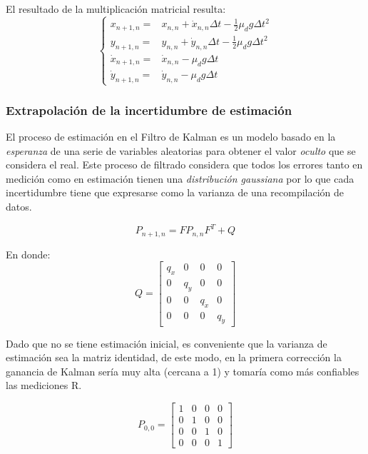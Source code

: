 El resultado de la multiplicación matricial resulta:
\begin{equation}
\left\{\begin{matrix}
x_{n+1, n} = & x_{n,n} + \dot{x}_{n,n} \Delta t - \frac{1}{2} \mu_d g \Delta t^2\\ 
y_{n+1, n} = & y_{n,n} + \dot{y}_{n,n} \Delta t - \frac{1}{2} \mu_d g \Delta t^2\\ 
\dot{x}_{n+1, n} = & \dot{x}_{n,n} - \mu_d g \Delta t\\ 
\dot{y}_{n+1, n} = &\dot{y}_{n,n} - \mu_d g \Delta t 
\end{matrix}\right.
\end{equation}

		\subsubsection*{Extrapolación de la incertidumbre de estimación}
	El proceso de estimación en el Filtro de Kalman es un modelo basado en la \textit{esperanza} de una serie de variables aleatorias para obtener el valor \textit{oculto} que se considera el real. Este proceso de filtrado considera que todos los errores tanto en medición como en estimación tienen una \textit{distribución gaussiana} por lo que cada incertidumbre tiene que expresarse como la varianza de una recompilación de datos.
	
\begin{equation}
P_{n+1,n} = F P_{n,n} F^{T} + Q
\label{eq:extrapolation_covariance}
\end{equation}

En donde:
\begin{equation}
Q =
\begin{bmatrix}
q_x & 0 & 0 & 0\\ 
0 & q_y & 0 & 0\\ 
0 & 0 & q_{\dot{x}} & 0\\ 
0 & 0 & 0 & q_{\dot{y}}
\end{bmatrix}
\end{equation}	

Dado que no se tiene estimación inicial, es conveniente que la varianza de estimación sea la matriz identidad, de este modo, en la primera corrección la ganancia de Kalman sería muy alta (cercana a 1) y tomaría como más confiables las mediciones R.

\begin{equation}
P_{0,0} =
\begin{bmatrix}
1 & 0 & 0 & 0\\ 
0 & 1 & 0 & 0\\ 
0 & 0 & 1 & 0\\ 
0 & 0 & 0 & 1
\end{bmatrix}
\end{equation}	

